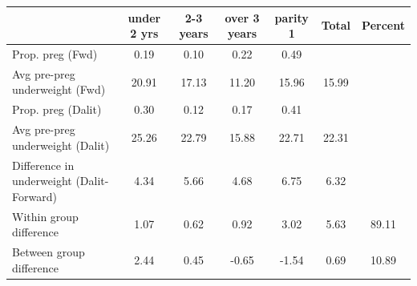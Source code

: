 \begin{tabular}{l*{6}{c}}
\toprule
            &\multicolumn{1}{c}{under 2 yrs}&\multicolumn{1}{c}{2-3 years}&\multicolumn{1}{c}{over 3 years}&\multicolumn{1}{c}{parity 1}&\multicolumn{1}{c}{Total}&\multicolumn{1}{c}{Percent}\\
\midrule
\midrule
Prop. preg (Fwd)&        0.19&        0.10&        0.22&        0.49&            &            \\
Avg pre-preg underweight (Fwd)&       20.91&       17.13&       11.20&       15.96&       15.99&            \\
Prop. preg (Dalit)&        0.30&        0.12&        0.17&        0.41&            &            \\
Avg pre-preg underweight (Dalit)&       25.26&       22.79&       15.88&       22.71&       22.31&            \\
Difference in underweight (Dalit-Forward)&        4.34&        5.66&        4.68&        6.75&        6.32&            \\
Within group difference&        1.07&        0.62&        0.92&        3.02&        5.63&       89.11\\
Between group difference&        2.44&        0.45&       -0.65&       -1.54&        0.69&       10.89\\
\bottomrule
\end{tabular}
